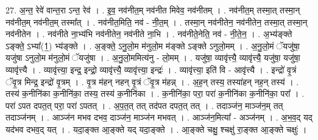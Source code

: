 \documentclass[17pt]{extarticle}
\begin{document}
27. अ॒न्त॒ रेवे॑ वान्त॒रा ऽन्त॒ रेव॑ । . इ॒व॒ नव॑नीत॒म् नव॑नीत मिवेव॒ नव॑नीतम् । . नव॑नीत॒म् तस्मा॒त् तस्मा॒न् नव॑नीत॒म् नव॑नीत॒म् तस्मा᳚त् । . नव॑नीत॒मिति॒ नव॑ - नी॒त॒म् । . तस्मा॒न् नव॑नीतेन॒ नव॑नीतेन॒ तस्मा॒त् तस्मा॒न् नव॑नीतेन । . नव॑नीते ना॒भ्य॑भि नव॑नीतेन॒ नव॑नीते ना॒भि । . नव॑नीते॒नेति॒ नव॑ - नी॒ते॒न॒ । . अ॒भ्य॑ङ्क्ते ऽङ्क्ते॒ ऽभ्या᳚(1॒) भ्य॑ङ्क्ते । . अ॒ङ्क्ते॒ ऽनु॒लो॒म म॑नुलो॒म म॑ङ्क्ते ऽङ्क्ते ऽनुलो॒मम् । . अ॒नु॒लो॒मं ॅयजु॑षा॒ यजु॑षा ऽनुलो॒म म॑नुलो॒मं ॅयजु॑षा । . अ॒नु॒लो॒ममित्य॑नु - लो॒मम् । . यजु॑षा॒ व्यावृ॑त्त्यै॒ व्यावृ॑त्त्यै॒ यजु॑षा॒ यजु॑षा॒ व्यावृ॑त्त्यै । . व्यावृ॑त्त्या॒ इन्द्र॒ इन्द्रो॒ व्यावृ॑त्त्यै॒ व्यावृ॑त्त्या॒ इन्द्रः॑ । . व्यावृ॑त्त्या॒ इति॑ वि - आवृ॑त्त्यै । . इन्द्रो॑ वृ॒त्रं ॅवृ॒त्र मिन्द्र॒ इन्द्रो॑ वृ॒त्रम् । . वृ॒त्र म॑हन् नहन् वृ॒त्रं ॅवृ॒त्र म॑हन्न् । . अ॒ह॒न् तस्य॒ तस्या॑हन् नह॒न् तस्य॑ । . तस्य॑ क॒नीनि॑का क॒नीनि॑का॒ तस्य॒ तस्य॑ क॒नीनि॑का । . क॒नीनि॑का॒ परा॒ परा॑ क॒नीनि॑का क॒नीनि॑का॒ परा᳚ । . परा॑ ऽपत दपत॒त् परा॒ परा॑ ऽपतत् । . अ॒प॒त॒त् तत् तद॑पत दपत॒त् तत् । . तदाञ्ज॑न॒ माञ्ज॑न॒म् तत् तदाञ्ज॑नम् । . आञ्ज॑न मभव दभव॒ दाञ्ज॑न॒ माञ्ज॑न मभवत् । . आञ्ज॑न॒मित्या᳚ - अञ्ज॑नम् । . अ॒भ॒व॒द् यद् यद॑भव दभव॒द् यत् । . यदा॒ङ्क्त आ॒ङ्क्ते यद् यदा॒ङ्क्ते । . आ॒ङ्क्ते चक्षु॒ श्चक्षु॑ रा॒ङ्क्त आ॒ङ्क्ते चक्षुः॑ । \newline
\end{document}
